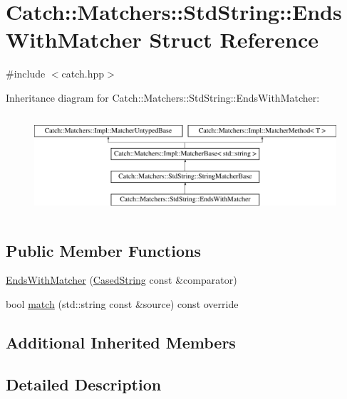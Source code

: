 \hypertarget{struct_catch_1_1_matchers_1_1_std_string_1_1_ends_with_matcher}{}\section{Catch\+:\+:Matchers\+:\+:Std\+String\+:\+:Ends\+With\+Matcher Struct Reference}
\label{struct_catch_1_1_matchers_1_1_std_string_1_1_ends_with_matcher}


{\ttfamily \#include $<$catch.\+hpp$>$}

Inheritance diagram for Catch\+:\+:Matchers\+:\+:Std\+String\+:\+:Ends\+With\+Matcher\+:\begin{figure}[H]
\begin{center}
\leavevmode
\includegraphics[height=3.758389cm]{struct_catch_1_1_matchers_1_1_std_string_1_1_ends_with_matcher}
\end{center}
\end{figure}
\subsection*{Public Member Functions}
\begin{DoxyCompactItemize}
\item 
\mbox{\hyperlink{struct_catch_1_1_matchers_1_1_std_string_1_1_ends_with_matcher_aa5ec700b4629562f74f362080accfd7b}{Ends\+With\+Matcher}} (\mbox{\hyperlink{struct_catch_1_1_matchers_1_1_std_string_1_1_cased_string}{Cased\+String}} const \&comparator)
\item 
bool \mbox{\hyperlink{struct_catch_1_1_matchers_1_1_std_string_1_1_ends_with_matcher_aca2741fa57374a2a98d2a84ac3e13a6d}{match}} (std\+::string const \&source) const override
\end{DoxyCompactItemize}
\subsection*{Additional Inherited Members}


\subsection{Detailed Description}


